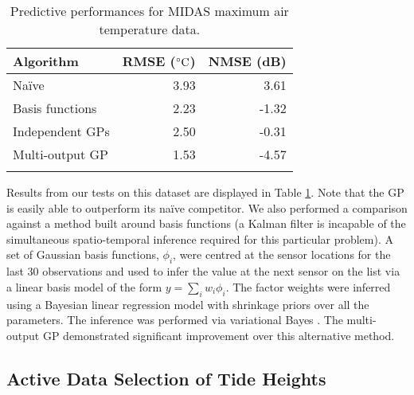 \documentclass{acmsmall}
\begin{document}
\begin{table}
\centering
\caption{Predictive performances for MIDAS maximum air temperature data.}
\label{tbl:MIDAS_RMSEs}
 \begin{tabular}{@{}lrr@{}}
\\
\toprule
Algorithm & RMSE ($\degree\text{C}$) & NMSE (dB)\\
\midrule
Na\"{i}ve & 3.93 & 3.61\\
Basis functions & 2.23 & -1.32 \\
Independent GPs & 2.50 & -0.31 \\
Multi-output GP & 1.53 & -4.57 \\
\bottomrule
& \\
\end{tabular}
\end{table}

Results from our tests on this dataset are displayed in Table \ref{tbl:MIDAS_RMSEs}. Note that the GP is easily able to outperform its na\"{i}ve competitor. We also performed a comparison against a method built around basis functions (a Kalman filter is incapable of the simultaneous spatio-temporal inference required for this particular problem). A set of Gaussian basis functions, $\phi_i$, were centred at the sensor locations for the last 30 observations and used to infer the value at the next sensor on the list via a linear basis model of the form $y = \sum_i w_i \phi_i$. The factor weights were inferred using a Bayesian linear regression model with shrinkage priors over all the parameters. The inference was performed via variational Bayes \cite{Bishop}. The multi-output GP demonstrated significant improvement over this alternative method. 


\subsection{Active Data Selection of Tide Heights}\label{active_selection_evaluation}
\end{document}
